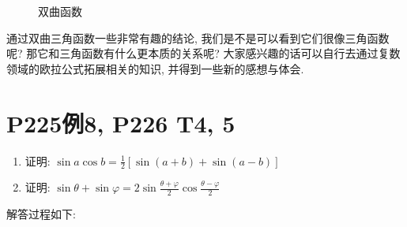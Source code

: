 \documentclass{book}
\begin{document}
    \begin{figure}[htbp]    %
        \centering            %
        \caption{双曲函数}    %
        \label{fig:subfig_1}            %
    \end{figure}

    通过双曲三角函数一些非常有趣的结论, 我们是不是可以看到它们很像三角函数呢? 那它和三角函数有什么更本质的关系呢? 大家感兴趣的话可以自行去通过复数领域的欧拉公式拓展相关的知识, 并得到一些新的感想与体会.
    \section{\textcolor[rgb]{0.11,0.65,0.52}{P225例8, P226 T4, 5}}
    \begin{boxB}
        \begin{enumerate}
            \item 证明: $\displaystyle \sin a\cos b=\frac{1}{2}[\sin(a+b)+\sin(a-b)]$
            \item 证明: $\displaystyle \sin \theta + \sin \varphi = 2\sin\frac{\theta+\varphi}{2}\cos\frac{\theta-\varphi}{2}$
        \end{enumerate}
    \end{boxB}
    解答过程如下:
\end{document}

